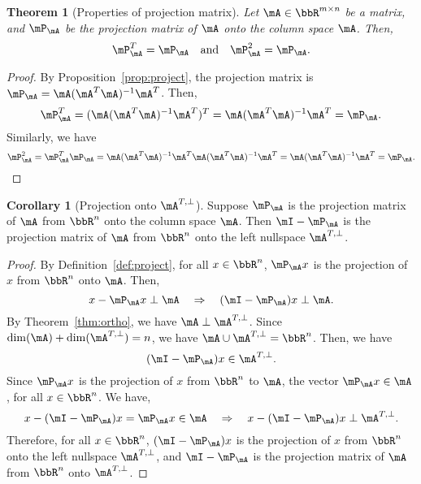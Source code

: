 \documentclass[11pt]{article}
\theoremstyle{plain}
\newtheorem{thm}{Theorem}[section]
\theoremstyle{definition}
\newtheorem{cor}{Corollary}
\begin{document}
\begin{thm}[Properties of projection matrix]\label{thm:projectm}
Let $\mA \in \bbR^{m \times n}$ be a matrix, and $\mP_{\mA}$ be the projection matrix of $\mA$ onto the column space $\mA$. Then,
	\begin{equation}\label{eq:projectm}
		\mP_{\mA}^T = \mP_{\mA}\quad \text{and}\quad  \mP_{\mA}^2 = \mP_{\mA}.
	\end{equation}
\end{thm}
\begin{proof}
	By Proposition~\ref{prop:project}, the projection matrix is $\mP_{\mA} =   \mA(\mA^T \mA)^{-1} \mA^T$. Then,
	\[  \mP_{\mA}^T = (\mA(\mA^T \mA)^{-1} \mA^T )^T = \mA (\mA^T \mA)^{-1} \mA^T = \mP_{\mA}. \]
Similarly, we have
	\[  \mP_{\mA}^2 = \mP_{\mA}^T \mP_{\mA} =  \mA (\mA^T \mA)^{-1} \mA^T  \mA (\mA^T \mA)^{-1} \mA^T =  \mA (\mA^T \mA)^{-1} \mA^T = \mP_{\mA}. \]
\end{proof}

\begin{cor}[Projection onto $\mA^{T,\perp}$]\label{cor:iprojectm}
	Suppose $\mP_{\mA}$ is the projection matrix of $\mA$ from $\bbR^n$ onto the column space $\mA$. Then $\mI-\mP_{\mA}$ is the projection matrix of $\mA$ from $\bbR^n$ onto the left nullspace $\mA^{T,\perp}$. 
\end{cor}

\begin{proof}
	By Definition~\ref{def:project}, for all $x \in \bbR^n$, $\mP_{\mA} x$ is the projection of $x$ from $\bbR^n$ onto $\mA$. Then,
	\[ x - \mP_{\mA} x \perp \mA \quad \Rightarrow \quad (\mI-\mP_{\mA})x \perp \mA. \]
	By Theorem~\ref{thm:ortho}, we have $\mA \perp \mA^{T,\perp}$. Since $\dim(\mA) + \dim(\mA^{T,\perp}) = n$, we have $\mA  \cup \mA^{T,\perp} = \bbR^n$. Then, we have
	\[ (\mI-\mP_{\mA})x \in  \mA^{T,\perp}.\]
	Since $\mP_{\mA} x$ is the projection of $x$ from $\bbR^n$ to $\mA$,  the vector $\mP_{\mA} x \in \mA$, for all  $x \in \bbR^n$. We have,
	\[ x -  (\mI-\mP_{\mA})x = \mP_{\mA} x \in \mA \quad \Rightarrow \quad  x -  (\mI-\mP_{\mA})x \perp \mA^{T,\perp}.\]
	Therefore, for all $x \in \bbR^n$, $(\mI-\mP_{\mA})x$ is the projection of $x$ from $\bbR^n$ onto the left nullspace $\mA^{T,\perp}$, and $\mI-\mP_{\mA}$ is the projection matrix of $\mA$ from $\bbR^n$ onto $\mA^{T,\perp}$.
\end{proof}
\end{document}
